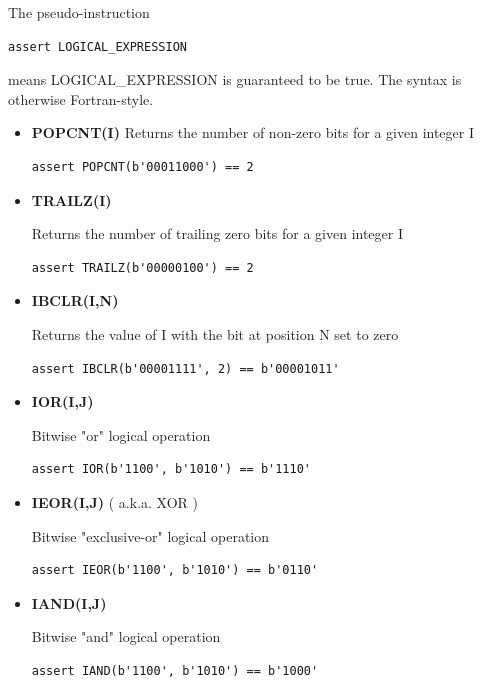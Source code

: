 The pseudo-instruction

\begin{lstlisting}
assert LOGICAL_EXPRESSION
\end{lstlisting}
means LOGICAL\_EXPRESSION is guaranteed to be true. The syntax is otherwise Fortran-style.
      
      

\begin{itemize}
	      
	\item \textbf{POPCNT(I)}       
	Returns the number of non-zero bits for a given integer I
	\begin{lstlisting}
assert POPCNT(b'00011000') == 2
	\end{lstlisting}
	
	      
	\item \textbf{TRAILZ(I)}
	            
	Returns the number of trailing zero bits for a given integer I
	\begin{lstlisting}
assert TRAILZ(b'00000100') == 2
	\end{lstlisting}
	      
	      
	\item \textbf{IBCLR(I,N)}
	            
	      Returns the value of I with the bit at position N set to zero
	\begin{lstlisting}
assert IBCLR(b'00001111', 2) == b'00001011'
	\end{lstlisting}
	      
	     
   	\item \textbf{IOR(I,J)}
	            
	      Bitwise "or" logical operation
	\begin{lstlisting}
assert IOR(b'1100', b'1010') == b'1110'
	\end{lstlisting}

	 
	\item \textbf{IEOR(I,J)} ( a.k.a. XOR )
	            
	      Bitwise "exclusive-or" logical operation
	\begin{lstlisting}
assert IEOR(b'1100', b'1010') == b'0110'
	\end{lstlisting}
	      
	      
	\item \textbf{IAND(I,J)}
	            
	      Bitwise "and" logical operation
	\begin{lstlisting}
assert IAND(b'1100', b'1010') == b'1000'
	\end{lstlisting}
	      

\end{itemize}
